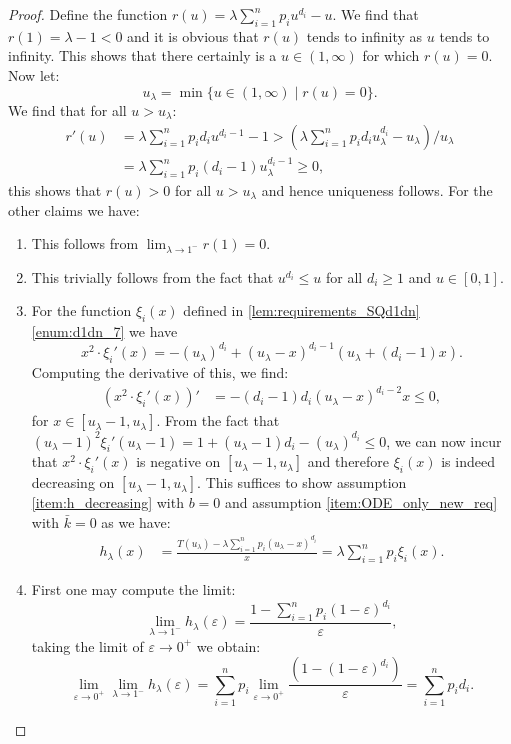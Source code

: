 \documentclass[12pt]{report}
\begin{document}
\begin{proof}

Define the function $r(u)=\lambda \sum_{i=1}^n p_i u^{d_i} - u$. We find that $r(1) = \lambda - 1 <0$ and it is obvious that $r(u)$ tends to infinity as $u$ tends to infinity. This shows that there certainly is a $u \in (1,\infty)$ for which $r(u)=0$. Now let:
$$
u_{\lambda} = \min\{u\in (1,\infty) \mid r(u) = 0\}.
$$
We find that for all $u > u_{\lambda}$:
\begin{align*}
r'(u)
&= \lambda \sum_{i=1}^n p_i d_i u^{d_i-1} - 1 > \left(\lambda \sum_{i=1}^n p_i d_i u_{\lambda}^{d_i} - u_{\lambda}\right)/u_{\lambda} \\
&= \lambda \sum_{i=1}^n p_i (d_i-1) u_{\lambda}^{d_i-1} \geq 0,
\end{align*}
this shows that $r(u) >0$ for all $u > u_{\lambda}$ and hence uniqueness follows. For the other claims we have:
\begin{enumerate}[label=(\alph*),leftmargin=*]
\item This follows from $\lim_{\lambda \rightarrow 1^-} r(1) = 0$.
\item This trivially follows from the fact that $u^{d_i} \leq u$ for all $d_i \geq 1$ and $u \in [0,1]$.
\item For the function $\xi_i(x)$ defined in \ref{lem:requirements_SQd1dn}\ref{enum:d1dn_7} we have
$$
x^2 \cdot \xi_i'(x)= -(u_\lambda)^{d_i} + (u_\lambda - x)^{d_i-1} (u_\lambda + (d_i-1) x ).
$$
Computing the derivative of this, we find:
\begin{align*}
(x^2 \cdot \xi_i'(x))'& = -(d_i-1) d_i (u_\lambda - x)^{d_i-2} x \leq 0,
\end{align*}
for $x \in [u_\lambda-1,u_\lambda]$.
From the fact that $(u_\lambda-1)^2 \xi_i'(u_\lambda-1) = 1+(u_\lambda-1)d_i -(u_\lambda)^{d_i} \leq 0$, we can now incur that $x^2 \cdot \xi_i'(x)$ is negative on $[u_\lambda-1,u_\lambda]$ and therefore
$\xi_i(x)$ is indeed decreasing on $[u_\lambda-1,u_\lambda]$.
This suffices to show  assumption \ref{item:h_decreasing} with
$b=0$ and assumption \ref{item:ODE_only_new_req} with $\bar k =0$ as we have:
\begin{align*}
h_\lambda(x)
&=
\frac{T(u_\lambda) - \lambda \sum_{i=1}^n p_i (u_\lambda - x)^{d_i}}{x}= \lambda \sum_{i=1}^n p_i \xi_i(x). 
\end{align*}
\item First one may compute the limit:
$$
\lim_{\lambda \rightarrow 1^-} h_\lambda(\varepsilon)= \frac{1-\sum_{i=1}^n p_i (1-\varepsilon)^{d_i} }{\varepsilon},
$$
taking the limit of $\varepsilon \rightarrow 0^+$ we obtain:
$$
\lim_{\varepsilon \rightarrow 0^+} \lim_{\lambda\rightarrow 1^-} h_\lambda(\varepsilon) =  \sum_{i=1}^n p_i \lim_{\varepsilon \rightarrow 0^+} \frac{(1-(1-\varepsilon)^{d_i})}{\varepsilon}=\sum_{i=1}^n p_i d_i.
$$
\end{enumerate}
\end{proof}
\end{document}
